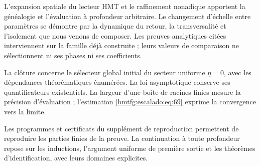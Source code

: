 L’expansion spatiale du lecteur HMT et le raffinement nonadique apportent la généalogie et l’évaluation à profondeur arbitraire. Le changement d’échelle entre paramètres se démontre par la dynamique du retour, la transversalité et l’isolement que nous venons de composer. Les preuves analytiques citées interviennent sur la famille déjà construite ; leurs valeurs de comparaison ne sélectionnent ni ses phases ni ses coefficients.

La clôture concerne le sélecteur global initial du secteur uniforme \(\eta=0\), avec les dépendances théorématiques énumérées. La loi asymptotique conserve ses quantificateurs existentiels. La largeur d’une boîte de racines finies mesure la précision d’évaluation ; l’estimation \eqref{hmtfg:escalado:eq:69} exprime la convergence vers la limite.


Les programmes et certificats du supplément de reproduction permettent de reproduire les parties finies de la preuve. La continuation à toute profondeur repose sur les inductions, l’argument uniforme de première sortie et les théorèmes d’identification, avec leurs domaines explicites.
